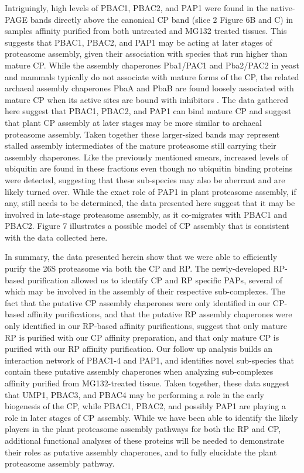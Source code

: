 Intriguingly, high levels of PBAC1, PBAC2, and PAP1 were found in the native-PAGE bands directly above the canonical CP band (slice 2 Figure 6B and C) in samples affinity purified from both untreated and MG132 treated tissues. This suggests that PBAC1, PBAC2, and PAP1 may be acting at later stages of proteasome assembly, given their association with species that run higher than mature CP. While the assembly chaperones Pba1/PAC1 and Pba2/PAC2 in yeast and mammals typically do not associate with mature forms of the CP, the related archaeal assembly chaperones PbaA and PbaB are found loosely associated with mature CP when its active sites are bound with inhibitors \citep{kusmierczyk11}. The data gathered here suggest that PBAC1, PBAC2, and PAP1 can bind mature CP and suggest that plant CP assembly at later stages may be more similar to archaeal proteasome assembly. Taken together these larger-sized bands may represent stalled assembly intermediates of the mature proteasome still carrying their assembly chaperones. Like the previously mentioned smears, increased levels of ubiquitin are found in these fractions even though no ubiquitin binding proteins were detected, suggesting that these sub-species may also be aberrant and are likely turned over. While the exact role of PAP1 in plant proteasome assembly, if any, still needs to be determined, the data presented here suggest that it may be involved in late-stage proteasome assembly, as it co-migrates with PBAC1 and PBAC2. Figure 7 illustrates a possible model of CP assembly that is consistent with the data collected here. 

In summary, the data presented herein show that we were able to efficiently purify the 26S proteasome via both the CP and RP. The newly-developed RP-based purification allowed us to identify CP and RP specific PAPs, several of which may be involved in the assembly of their respective sub-complexes. The fact that the putative CP assembly chaperones were only identified in our CP-based affinity purifications, and that the putative RP assembly chaperones were only identified in our RP-based affinity purifications, suggest that only mature RP is purified with our CP affinity preparation, and that only mature CP is purified with our RP affinity purification. Our follow up analysis builds an interaction network of PBAC1-4 and PAP1, and identifies novel sub-species that contain these putative assembly chaperones when analyzing sub-complexes affinity purified from MG132-treated tissue. Taken together, these data suggest that UMP1, PBAC3, and PBAC4 may be performing a role in the early biogenesis of the CP, while PBAC1, PBAC2, and possibly PAP1 are playing a role in later stages of CP assembly. While we have been able to identify the likely players in the plant proteasome assembly pathways for both the RP and CP, additional functional analyses of these proteins will be needed to demonstrate their roles as putative assembly chaperones, and to fully elucidate the plant proteasome assembly pathway.  

